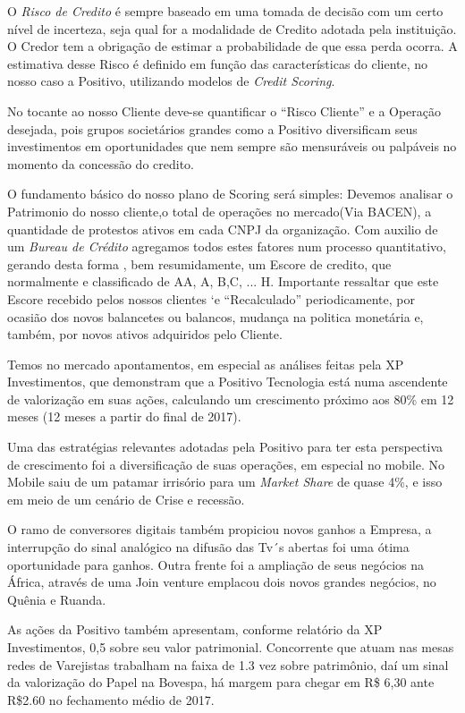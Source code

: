 O \emph{Risco de Credito} é sempre baseado em uma tomada de decisão com um certo nível de incerteza, seja qual for a modalidade de Credito adotada pela instituição\cite{sicsu2010}. O Credor tem a obrigação de estimar a probabilidade de que essa  perda ocorra.
A estimativa desse Risco é definido em função das características do cliente, no nosso caso a Positivo, utilizando modelos de \emph{Credit Scoring}.

No tocante ao nosso Cliente deve-se quantificar o “Risco Cliente” e a Operação desejada, pois grupos societários grandes como a Positivo diversificam seus investimentos em oportunidades que nem sempre são mensuráveis ou palpáveis no momento da concessão do credito.

O fundamento básico do nosso plano de Scoring será simples: Devemos analisar o Patrimonio do nosso cliente,o total de operações no mercado(Via BACEN), a quantidade de protestos ativos em cada CNPJ da organização. Com auxilio de um \emph{Bureau de Crédito} agregamos todos estes fatores num processo quantitativo, gerando desta forma , bem resumidamente, um Escore de credito, que normalmente e classificado de AA, A, B,C, ... H. Importante ressaltar que este Escore recebido pelos nossos clientes ‘e “Recalculado” periodicamente, por ocasião dos novos balancetes ou balancos, mudança na politica monetária e, também, por novos ativos adquiridos pelo Cliente.

Temos no mercado apontamentos, em especial as análises feitas pela XP Investimentos, que demonstram que a Positivo Tecnologia está numa ascendente de valorização em suas ações, calculando um crescimento próximo aos 80\% em 12 meses (12 meses a partir do final de 2017).

Uma das estratégias relevantes adotadas pela Positivo para ter esta perspectiva de crescimento foi a diversificação de suas operações, em especial no mobile. No Mobile saiu de um patamar irrisório para um \emph{Market Share} de quase 4\%, e isso em meio de um cenário de Crise e recessão.

O ramo de conversores digitais também propiciou novos ganhos a Empresa, a interrupção do sinal analógico na difusão das Tv´s abertas foi uma ótima oportunidade para ganhos.
Outra frente foi a ampliação de seus negócios na África, através de uma Join venture emplacou dois novos grandes negócios, no Quênia e Ruanda.

As ações da Positivo também apresentam, conforme relatório da XP Investimentos, 0,5 sobre seu valor patrimonial. Concorrente que atuam nas mesas redes de Varejistas trabalham na faixa de 1.3 vez sobre patrimônio, daí um sinal da valorização do Papel na Bovespa, há margem para chegar em R\$ 6,30 ante R\$2.60 no fechamento médio de 2017.

